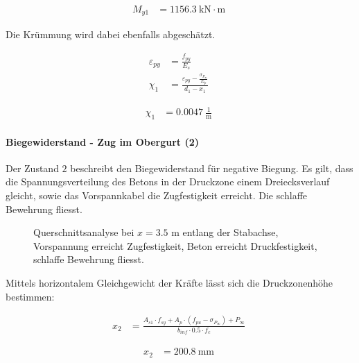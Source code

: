 \documentclass[
  11pt,
  letterpaper,
]{scrreprt}
\let\oldparagraph\paragraph
\renewcommand{\paragraph}[1]{\oldparagraph{#1}\mbox{}}
\begin{document}
$$
\begin{aligned}
M_{y1} &= 1156.3\ \mathrm{kN} \cdot \mathrm{m} \;
\end{aligned}
$$

Die Krümmung wird dabei ebenfalls abgeschätzt.

$$
\begin{aligned}
\varepsilon_{py} &= \frac{ f_{py} }{ E_{s} } \; 
\\[10pt]
\chi_{1} &= \frac{ \varepsilon_{py} - \frac{ \sigma_{P_{\infty}} }{ E_{p} } }{ d_{1} - x_{1} } \; 
\end{aligned}
$$

$$
\begin{aligned}
\chi_{1} &= 0.0047\ \frac{1}{\mathrm{m}} \;
\end{aligned}
$$

\paragraph{Biegewiderstand - Zug im Obergurt
(2)}\label{biegewiderstand---zug-im-obergurt-2}

Der Zustand \(2\) beschreibt den Biegewiderstand für negative Biegung.
Es gilt, dass die Spannungsverteilung des Betons in der Druckzone einem
Dreiecksverlauf gleicht, sowie das Vorspannkabel die Zugfestigkeit
erreicht. Die schlaffe Bewehrung fliesst.

\begin{figure}[H]


\caption{\label{fig-t6_qs_MR_pos}Querschnittsanalyse bei \(x=3.5\) m
entlang der Stabachse, Vorspannung erreicht Zugfestigkeit, Beton
erreicht Druckfestigkeit, schlaffe Bewehrung fliesst.}

\end{figure}%

Mittels horizontalem Gleichgewicht der Kräfte lässt sich die
Druckzonenhöhe bestimmen:

$$
\begin{aligned}
x_{2} &= \frac{ A_{s1} \cdot f_{sy} + A_{p} \cdot \left( f_{pu} - \sigma_{P_{\infty}} \right) + P_{\infty} }{ b_{inf} \cdot 0.5 \cdot f_{c} } \; 
\end{aligned}
$$

$$
\begin{aligned}
x_{2} &= 200.8\ \mathrm{mm} \;
\end{aligned}
$$
\end{document}
